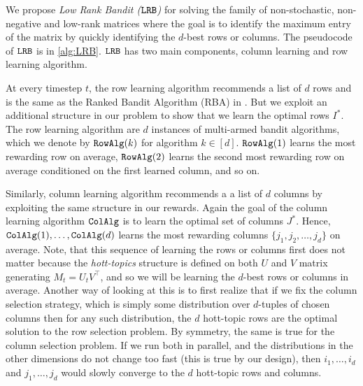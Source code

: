 We propose \emph{Low Rank Bandit (${\tt LRB}$)} for solving the family of non-stochastic, non-negative and low-rank matrices where the goal is to identify the maximum entry of the matrix by quickly identifying the $d$-best rows or columns. The pseudocode of ${\tt LRB}$ is in \cref{alg:LRB}. ${\tt LRB}$ has two main components, column learning and row learning algorithm. 

At every timestep $t$, the row learning algorithm recommends a list of $d$ rows and is the same as the Ranked Bandit Algorithm (RBA) in \citet{radlinski2008learning}. But we exploit an additional structure in our problem to show that we learn the optimal rows $I^\ast$. The row learning algorithm are $d$ instances of multi-armed bandit algorithms, which we denote by ${\tt RowAlg}(k)$ for algorithm $k \in [d]$. ${\tt RowAlg}(1)$ learns the most rewarding row on average, ${\tt RowAlg}(2)$ learns the second most rewarding row on average conditioned on the first learned column, and so on.


Similarly, column learning algorithm recommends a a list of $d$ columns by exploiting the same structure in our rewards. Again the goal of the column learning algorithm ${\tt ColAlg}$ is to learn the optimal set of columns $J^\ast$. Hence, ${\tt ColAlg}(1),\dots,{\tt ColAlg}(d)$ learns the most rewarding columns $\lbrace j_1,j_2,\dots,j_d \rbrace$ on average. Note, that this sequence of learning the rows or columns first does not matter because the \emph{hott-topics} structure is defined on both $U$ and $V$ matrix generating $M_t = U_t V^\intercal$, and so we will be learning the $d$-best rows or columns in average. Another way of looking at this is to first realize that if we fix the column selection strategy, which is simply some distribution over $d$-tuples of chosen columns then for any such distribution, the $d$ hott-topic rows are the optimal solution to the row selection problem. By symmetry, the same is true for the column selection problem. If we run both in parallel, and the distributions in the other dimensions do not change too fast (this is true by our design), then $i_1, \dots, i_d$ and $j_1, \dots, j_d$ would slowly converge to the $d$ hott-topic rows and columns.




